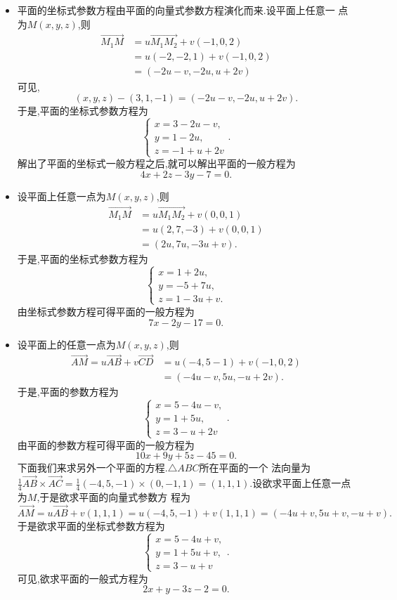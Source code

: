 \documentclass[a4paper]{article}
\newcommand{\ov}{\overrightarrow} \newcommand{\sik}{\sum_{i=1}^k}
\begin{document}
\begin{itemize}
\item 平面的坐标式参数方程由平面的向量式参数方程演化而来.设平面上任意一
  点为$M(x,y,z)$,则
  \begin{align*}
    \ov{M_1M}&=u\ov{M_1M_2}+v(-1,0,2)\\&=u(-2,-2,1)+v(-1,0,2)\\&=(-2u-v,-2u,u+2v)
  \end{align*}
  可见,
$$
(x,y,z)-(3,1,-1)=(-2u-v,-2u,u+2v).
$$
于是,平面的坐标式参数方程为
$$
\begin{cases}
  x=3-2u-v,\\
  y=1-2u,\\
  z=-1+u+2v
\end{cases}.
$$
解出了平面的坐标式一般方程之后,就可以解出平面的一般方程为
$$
4x+2z-3y-7=0.
$$
\item 设平面上任意一点为$M(x,y,z)$,则
  \begin{align*}
    \ov{M_1M}&=u\ov{M_1M_2}+v(0,0,1)\\&=u(2,7,-3)+v(0,0,1)\\&=(2u,7u,-3u+v).
  \end{align*}
于是,平面的坐标式参数方程为
$$
\begin{cases}
  x=1+2u,\\
y=-5+7u,\\
z=1-3u+v.
\end{cases}
$$
由坐标式参数方程可得平面的一般方程为
$$
7x-2y-17=0.
$$
\item \subitem 设平面上的任意一点为$M(x,y,z)$,则
  \begin{align*}
    \ov{AM}=u\ov{AB}+v\ov{CD}&=u(-4,5-1)+v(-1,0,2)\\&=(-4u-v,5u,-u+2v).
  \end{align*}
于是,平面的参数方程为
$$
\begin{cases}
  x=5-4u-v,\\
y=1+5u,\\
z=3-u+2v
\end{cases}.
$$
由平面的参数方程可得平面的一般方程为
$$
10x+9y+5z-45=0.
$$
\subitem 下面我们来求另外一个平面的方程.$\triangle ABC$所在平面的一个
法向量为$\frac{1}{4}\ov{AB}\times\ov{AC}=\frac{1}{4}(-4,5,-1)\times
(0,-1,1)=(1,1,1)$.设欲求平面上任意一点为$M$,于是欲求平面的向量式参数方
程为
$$
\ov{AM}=u\ov{AB}+v(1,1,1)=u(-4,5,-1)+v(1,1,1)=(-4u+v,5u+v,-u+v).
$$
于是欲求平面的坐标式参数方程为
$$
\begin{cases}
  x=5-4u+v,\\
y=1+5u+v,\\
z=3-u+v
\end{cases}.
$$
可见,欲求平面的一般式方程为
$$
2x+y-3z-2=0.
$$
\end{itemize}
\end{document}
